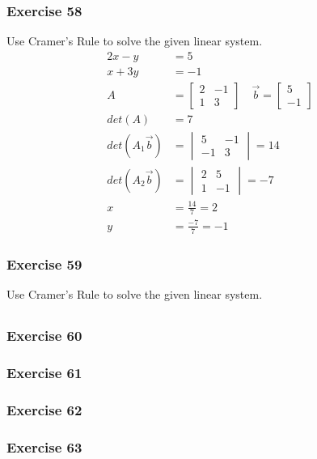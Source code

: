 \documentclass{math}
\begin{document}
\subsubsection*{Exercise 58}
Use Cramer's Rule to solve the given linear system.
\begin{align*}
  2x-y &= 5 \\
  x+3y &= -1 \\
  A &= \begin{bmatrix}2 & -1 \\ 1 & 3\end{bmatrix} \quad
    \vec{b} = \begin{bmatrix}5 \\ -1\end{bmatrix} \\
  det(A) &= 7 \\
  det(A_1\vec{b}) &= \begin{vmatrix}5 & -1 \\ -1 & 3 \end{vmatrix} = 14 \\
  det(A_2\vec{b}) &= \begin{vmatrix}2 & 5 \\ 1 & -1\end{vmatrix} = -7 \\
  x &= \frac{14}{7} = 2 \\
  y &= \frac{-7}{7} = -1
\end{align*}

\subsubsection*{Exercise 59}
Use Cramer's Rule to solve the given linear system.
\begin{align*}
\end{align*}

\subsubsection*{Exercise 60}
\subsubsection*{Exercise 61}
\subsubsection*{Exercise 62}
\subsubsection*{Exercise 63}
\end{document}
